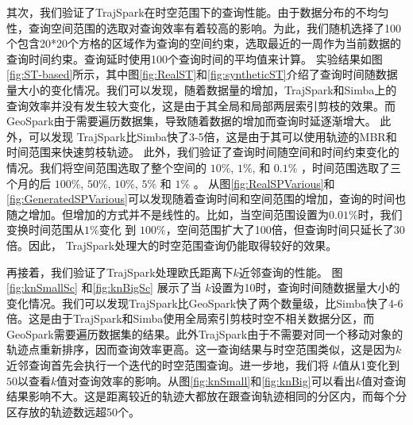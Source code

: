 其次，我们验证了TrajSpark在时空范围下的查询性能。由于数据分布的不均匀性，查询空间范围的选取对查询效率有着较高的影响。为此，我们随机选择了100个包含20*20个方格的区域作为查询的空间约束，选取最近的一周作为当前数据的查询时间约束。查询延时使用100个查询时间的平均值来计算。
实验结果如图\ref{fig:ST-based}所示，其中图\ref{fig:RealST}和\ref{fig:syntheticST}介绍了查询时间随数据量大小的变化情况。我们可以发现，随着数据量的增加，TrajSpark和Simba上的查询效率并没有发生较大变化，这是由于其全局和局部两层索引剪枝的效果。而GeoSpark由于需要遍历数据集，导致随着数据的增加而查询时延逐渐增大。 此外，可以发现 TrajSpark比Simba快了3-5倍，这是由于其可以使用轨迹的MBR和时间范围来快速剪枝轨迹。
此外，我们验证了查询时间随空间和时间约束变化的情况。我们将空间范围选取了整个空间的 $10\%$, $1\%$, 和 $0.1\%$ ，时间范围选取了三个月的后 $100\%$, $50\%$, $10\%$, $5\%$ 和 $1\%$ 。
从图\ref{fig:RealSPVarious}和\ref{fig:GeneratedSPVarious}可以发现随着查询时间和空间范围的增加，查询的时间也随之增加。但增加的方式并不是线性的。比如，当空间范围设置为$0.01\%$时，我们变换时间范围从$1\%$变化 到 $100\%$，空间范围扩大了100倍，但查询时间只延长了30倍。因此，
TrajSpark处理大的时空范围查询仍能取得较好的效果。

再接着，我们验证了TrajSpark处理欧氏距离下$k$近邻查询的性能。
图\ref{fig:knSmallSc} 和\ref{fig:knBigSc} 展示了当 $k$设置为10时，查询时间随数据量大小的变化情况。我们可以发现TrajSpark比GeoSpark快了两个数量级，比Simba快了4-6倍。这是由于TrajSpark和Simba使用全局索引剪枝时空不相关数据分区，而GeoSpark需要遍历数据集的结果。此外TrajSpark由于不需要对同一个移动对象的轨迹点重新排序，因而查询效率更高。这一查询结果与时空范围类似，这是因为$k$近邻查询首先会执行一个迭代的时空范围查询。进一步地，我们将 $k$值从1变化到$50$以查看$k$值对查询效率的影响。从图\ref{fig:knSmall}和\ref{fig:knBig}可以看出$k$值对查询结果影响不大。这是距离较近的轨迹大都放在跟查询轨迹相同的分区内，而每个分区存放的轨迹数远超50个。

